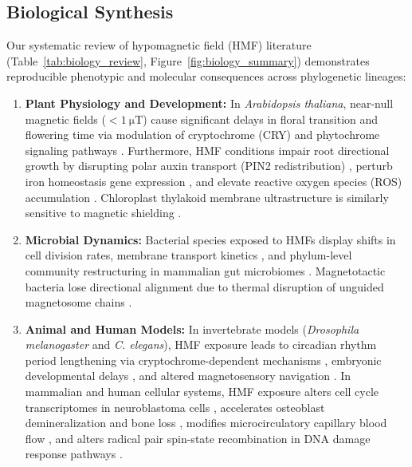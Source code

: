 

\subsection{Biological Synthesis}
Our systematic review of hypomagnetic field (HMF) literature (Table~\ref{tab:biology_review}, Figure~\ref{fig:biology_summary}) demonstrates reproducible phenotypic and molecular consequences across phylogenetic lineages:

\begin{enumerate}
    \item \textbf{Plant Physiology and Development:} In \textit{Arabidopsis thaliana}, near-null magnetic fields ($< \SI{1}{\micro\tesla}$) cause significant delays in floral transition and flowering time via modulation of cryptochrome (CRY) and phytochrome signaling pathways \citep{Agliassa2018}. Furthermore, HMF conditions impair root directional growth by disrupting polar auxin transport (PIN2 redistribution) \citep{Narayana2018}, perturb iron homeostasis gene expression \citep{Narayana2021}, and elevate reactive oxygen species (ROS) accumulation \citep{Maffei2014}. Chloroplast thylakoid membrane ultrastructure is similarly sensitive to magnetic shielding \citep{Belyavskaya2004}.
    \item \textbf{Microbial Dynamics:} Bacterial species exposed to HMFs display shifts in cell division rates, membrane transport kinetics \citep{Creanga2009}, and phylum-level community restructuring in mammalian gut microbiomes \citep{Zhang2017}. Magnetotactic bacteria lose directional alignment due to thermal disruption of unguided magnetosome chains \citep{Frankel1981}.
    \item \textbf{Animal and Human Models:} In invertebrate models (\textit{Drosophila melanogaster} and \textit{C. elegans}), HMF exposure leads to circadian rhythm period lengthening via cryptochrome-dependent mechanisms \citep{Yoshii2009}, embryonic developmental delays \citep{Vitas2015}, and altered magnetosensory navigation \citep{VidalGadea2015}. In mammalian and human cellular systems, HMF exposure alters cell cycle transcriptomes in neuroblastoma cells \citep{Mo2012}, accelerates osteoblast demineralization and bone loss \citep{Xu2012, Mo2014}, modifies microcirculatory capillary blood flow \citep{Gurfinkel2014}, and alters radical pair spin-state recombination in DNA damage response pathways \citep{Binhi2017, Hore2016}.
\end{enumerate}

